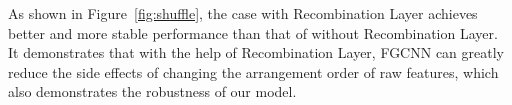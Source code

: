 As shown in  Figure~\ref{fig:shuffle}, the case with Recombination Layer achieves better and more stable performance than that of without Recombination Layer. It demonstrates that with the help of Recombination Layer, FGCNN can greatly reduce the side effects of changing the arrangement order of raw features, which also demonstrates the robustness of our model.





